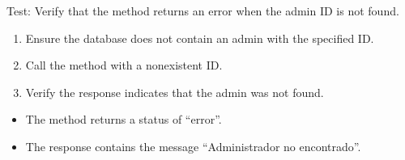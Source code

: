 \documentclass[letterpaper,10pt,english]{sphinxmanual}
\begin{document}
\begin{fulllineitems}
\label{\detokenize{test:test.test_admin.test_get_admin_by_id_not_found}}
\pysigstartsignatures
\pysiglinewithargsret
{}
{}
{}
\pysigstopsignatures
\sphinxAtStartPar
Test: Verify that the method returns an error when the admin ID is not found.
\begin{description}
\begin{enumerate}
%
\item {} 
\sphinxAtStartPar
Ensure the database does not contain an admin with the specified ID.

\item {} 
\sphinxAtStartPar
Call the  method with a non\sphinxhyphen{}existent ID.

\item {} 
\sphinxAtStartPar
Verify the response indicates that the admin was not found.

\end{enumerate}

\begin{itemize}
\item {} 
\sphinxAtStartPar
The method returns a status of “error”.

\item {} 
\sphinxAtStartPar
The response contains the message “Administrador no encontrado”.

\end{itemize}

\end{description}

\end{fulllineitems}

\end{document}
